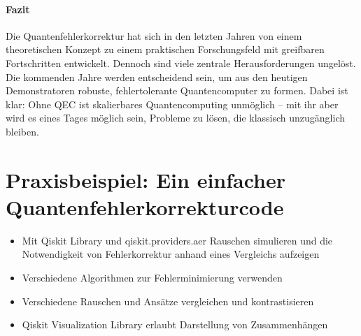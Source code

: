 \paragraph{Fazit} 
Die Quantenfehlerkorrektur hat sich in den letzten Jahren von einem theoretischen Konzept zu einem praktischen Forschungsfeld mit greifbaren Fortschritten entwickelt. Dennoch sind viele zentrale Herausforderungen ungel\"ost. Die kommenden Jahre werden entscheidend sein, um aus den heutigen Demonstratoren robuste, fehlertolerante Quantencomputer zu formen. Dabei ist klar: Ohne QEC ist skalierbares Quantencomputing unm\"oglich -- mit ihr aber wird es eines Tages m\"oglich sein, Probleme zu l\"osen, die klassisch unzug\"anglich bleiben.


\section{Praxisbeispiel: Ein einfacher Quantenfehlerkorrekturcode}
\begin{itemize}
    \item Mit Qiskit Library und qiskit.providers.aer Rauschen simulieren und die Notwendigkeit von Fehlerkorrektur anhand eines Vergleichs aufzeigen
    \item Verschiedene Algorithmen zur Fehlerminimierung verwenden
    \item Verschiedene Rauschen und Ansätze vergleichen und kontrastisieren
    \item Qiskit Visualization Library erlaubt Darstellung von Zusammenhängen
\end{itemize}



\printbibliography
